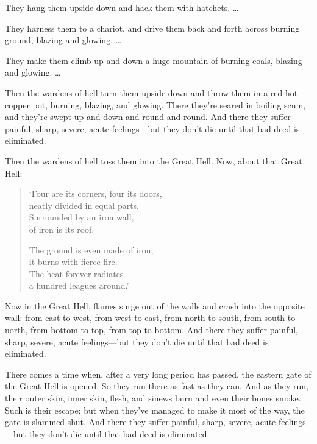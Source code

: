 \documentclass[12pt,openany]{book}%
\begin{document}
They hang them upside-down and hack them with hatchets. … 

They harness them to a chariot, and drive them back and forth across burning ground, blazing and glowing. … 

They make them climb up and down a huge mountain of burning coals, blazing and glowing. … 

Then the wardens of hell turn them upside down and throw them in a red-hot copper pot, burning, blazing, and glowing. There they’re seared in boiling scum, and they’re swept up and down and round and round. And there they suffer painful, sharp, severe, acute feelings—but they don’t die until that bad deed is eliminated. 

Then the wardens of hell toss them into the Great Hell. Now, about that Great Hell: 

\begin{verse}%
‘Four are its corners, four its doors, \\
neatly divided in equal parts. \\
Surrounded by an iron wall, \\
of iron is its roof. 

The ground is even made of iron, \\
it burns with fierce fire. \\
The heat forever radiates \\
a hundred leagues around.’ 

%
\end{verse}

Now in the Great Hell, flames surge out of the walls and crash into the opposite wall: from east to west, from west to east, from north to south, from south to north, from bottom to top, from top to bottom. And there they suffer painful, sharp, severe, acute feelings—but they don’t die until that bad deed is eliminated. 

There comes a time when, after a very long period has passed, the eastern gate of the Great Hell is opened. So they run there as fast as they can. And as they run, their outer skin, inner skin, flesh, and sinews burn and even their bones smoke. Such is their escape; but when they’ve managed to make it most of the way, the gate is slammed shut. And there they suffer painful, sharp, severe, acute feelings—but they don’t die until that bad deed is eliminated. 
\end{document}
